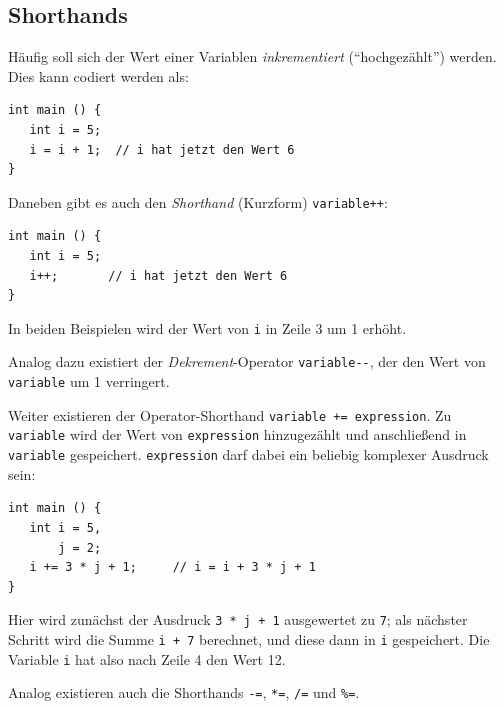 \subsection{Shorthands}
Häufig soll sich der Wert einer Variablen \emph{inkrementiert} (\enquote{hochgezählt}) werden. Dies kann codiert werden als:
\begin{codebox}
\begin{verbatim}
int main () {
   int i = 5;
   i = i + 1;  // i hat jetzt den Wert 6
}
\end{verbatim}
\end{codebox}

Daneben gibt es auch den \emph{Shorthand} (Kurzform) \texttt{variable++}:
\begin{codebox}
\begin{verbatim}
int main () {
   int i = 5;
   i++;       // i hat jetzt den Wert 6
}
\end{verbatim}
\end{codebox}

In beiden Beispielen wird der Wert von \texttt{i} in Zeile 3 um 1 erhöht.

Analog dazu existiert der \emph{Dekrement}-Operator \texttt{variable-{}-}, der den Wert von \texttt{variable} um 1 verringert.

Weiter existieren der Operator-Shorthand \texttt{variable += expression}. Zu \texttt{variable} wird der Wert von \texttt{expression} hinzugezählt und anschließend in \texttt{variable} gespeichert. \texttt{expression} darf dabei ein beliebig komplexer Ausdruck sein:
\begin{codebox}[Beispiel: Inkrementieren einer Variablen i mit Shorthand \texttt{+=}]
\begin{verbatim}
int main () {
   int i = 5,
       j = 2;
   i += 3 * j + 1;     // i = i + 3 * j + 1
}
\end{verbatim}
\end{codebox}
Hier wird zunächst der Ausdruck \texttt{3 * j + 1} ausgewertet zu \texttt{7}; als nächster Schritt wird die Summe \texttt{i + 7} berechnet, und diese dann in \texttt{i} gespeichert. Die Variable \texttt{i} hat also nach Zeile 4 den Wert 12.

Analog existieren auch die Shorthands \texttt{-=}, \texttt{*=}, \texttt{/=} und \texttt{\%=}.

